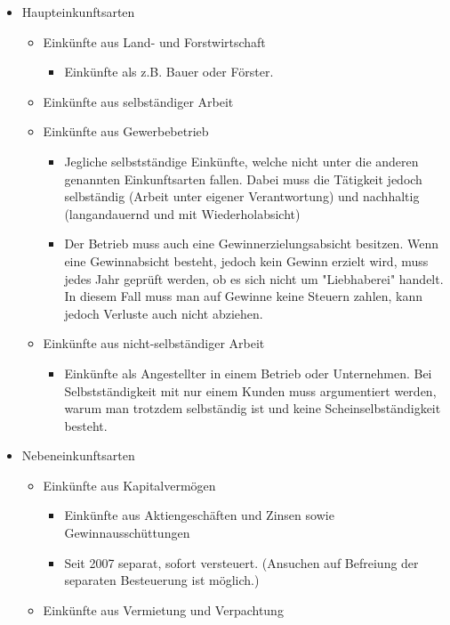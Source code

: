 \documentclass{article}
\begin{document}
	\begin{itemize}
			\item{Haupteinkunftsarten}
			\begin{itemize}
				\item{Einkünfte aus Land- und Forstwirtschaft}
				\begin{itemize}
					\item{Einkünfte als z.B. Bauer oder Förster.}
				\end{itemize}
				\item{Einkünfte aus selbständiger Arbeit}
				\item{Einkünfte aus Gewerbebetrieb}
				\begin{itemize}
					\item{Jegliche selbstständige Einkünfte, welche nicht unter die anderen genannten Einkunftsarten fallen. Dabei muss die Tätigkeit jedoch selbständig (Arbeit unter eigener Verantwortung) und nachhaltig (langandauernd und mit Wiederholabsicht)}
					\item{Der Betrieb muss auch eine Gewinnerzielungsabsicht besitzen. Wenn eine Gewinnabsicht besteht, jedoch kein Gewinn erzielt wird, muss jedes Jahr geprüft werden, ob es sich nicht um "Liebhaberei" handelt. In diesem Fall muss man auf Gewinne keine Steuern zahlen, kann jedoch Verluste auch nicht abziehen.}
				\end{itemize}
				\item{Einkünfte aus nicht-selbständiger Arbeit}
				\begin{itemize}
					\item{Einkünfte als Angestellter in einem Betrieb oder Unternehmen. Bei Selbstständigkeit mit nur einem Kunden muss argumentiert werden, warum man trotzdem selbständig ist und keine Scheinselbständigkeit besteht.}
				\end{itemize}
			\end{itemize}
			\item{Nebeneinkunftsarten}
			\begin{itemize}
				\item{Einkünfte aus Kapitalvermögen}
				\begin{itemize}
					\item{Einkünfte aus Aktiengeschäften und Zinsen sowie Gewinnausschüttungen}
					\item{Seit 2007 separat, sofort versteuert. (Ansuchen auf Befreiung der separaten Besteuerung ist möglich.)}
				\end{itemize}
				\item{Einkünfte aus Vermietung und Verpachtung}

\end{itemize}
\end{itemize}
\end{document}
